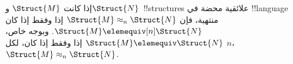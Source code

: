 \documentclass[../../../include/open-logic-section]{subfiles}
\begin{document}
\begin{cor}
  إذا كانت $\Struct{M}$ و$\Struct{N}$~!!{structure}s علائقية محضة في
  !!{language} منتهية، فإن $\Struct{M} \approx_n\Struct{N}$ إذا وفقط
  إذا كان $\Struct{M} \elemequiv[n] \Struct{N}$. وبوجه خاص،
  $\Struct{M} \elemequiv \Struct{N}$ إذا وفقط إذا كان، لكل $n$،
  $\Struct{M} \approx_n \Struct{N}$.
\end{cor}
\end{document}
